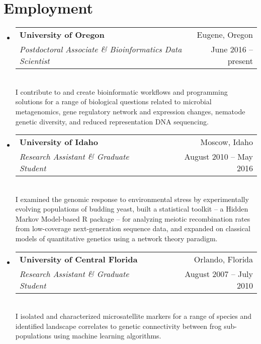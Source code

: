 \documentclass[11pt,letterpaper,sans]{moderncv}        %
\begin{document}
\section{Employment}

\begin{itemize}

\item{
\centering
  \begin{tabular}{p{15cm}r}
\textbf{University of Oregon} & Eugene, Oregon\\
\textit{Postdoctoral Associate \& Bioinformatics Data Scientist} & June 2016 -- present \\
  \end{tabular}
}
\\
I contribute to and create bioinformatic workflows and programming solutions for a range of biological questions related to microbial metagenomics, gene regulatory network and expression changes, nematode genetic diversity, and reduced representation DNA sequencing.
\vspace{4pt}

\item{
\centering
  \begin{tabular}{p{14.2cm}r}
\textbf{University of Idaho} & Moscow, Idaho\\
\textit{Research Assistant \& Graduate Student} & August 2010 -- May 2016 \\
  \end{tabular}
}
\\
I examined the genomic response to environmental stress by experimentally evolving populations of budding yeast, built a statistical toolkit -- a Hidden Markov Model-based R package -- for analyzing meiotic recombination rates from low-coverage next-generation sequence data, and expanded on classical models of quantitative genetics using a network theory paradigm.
\vspace{4pt}

\item{
\centering
  \begin{tabular}{p{14.2cm}r}
\textbf{University of Central Florida} & Orlando, Florida \\
\textit{Research Assistant \& Graduate Student} & August 2007 -- July 2010 \\
  \end{tabular}
}
\\
I isolated and characterized microsatellite markers for a range of species and identified landscape correlates to genetic connectivity between frog sub-populations using machine learning algorithms. 

\end{itemize}
\end{document}
